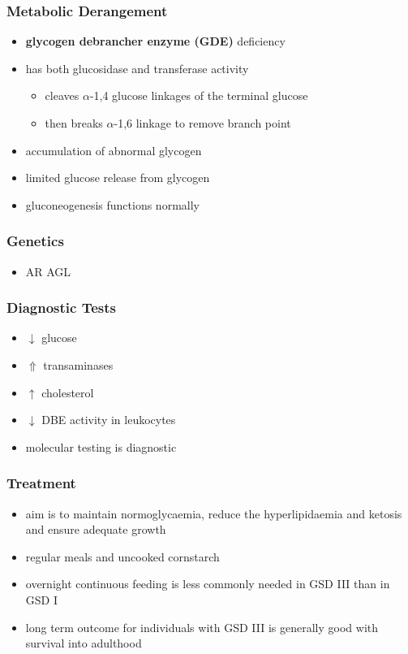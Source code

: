 \documentclass[12pt]{scrartcl}
\begin{document}
\subsubsection{Metabolic Derangement}
\label{sec:org41cf222}
\begin{itemize}
\item \textbf{glycogen debrancher enzyme (GDE)} deficiency
\item has both glucosidase and transferase activity
\begin{itemize}
\item cleaves \(\alpha\)-1,4 glucose linkages of the terminal glucose
\item then breaks \(\alpha\)-1,6 linkage to remove branch point
\end{itemize}
\item accumulation of abnormal glycogen
\item limited glucose release from glycogen
\item gluconeogenesis functions normally
\end{itemize}
\subsubsection{Genetics}
\label{sec:org75b5da5}
\begin{itemize}
\item AR AGL
\end{itemize}
\subsubsection{Diagnostic Tests}
\label{sec:org41be93c}
\begin{itemize}
\item \(\downarrow\) glucose
\item \(\Uparrow\) transaminases
\item \(\uparrow\) cholesterol
\item \(\downarrow\) DBE activity in leukocytes
\item molecular testing is diagnostic
\end{itemize}
\subsubsection{Treatment}
\label{sec:orgeb47fd2}
\begin{itemize}
\item aim is to maintain normoglycaemia, reduce the hyperlipidaemia and ketosis and
ensure adequate growth
\item regular meals and uncooked cornstarch
\item overnight continuous feeding is less commonly needed in GSD III than
in GSD I
\item long term outcome for individuals with GSD III is generally good
with survival into adulthood
\end{itemize}
\end{document}
